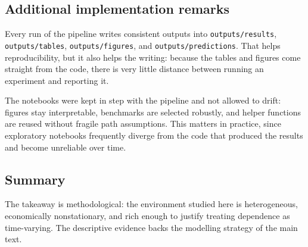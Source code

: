 \subsection{Additional implementation remarks}

Every run of the pipeline writes consistent outputs into \texttt{outputs/results}, \texttt{outputs/tables}, \texttt{outputs/figures}, and \texttt{outputs/predictions}. That helps reproducibility, but it also helps the writing: because the tables and figures come straight from the code, there is very little distance between running an experiment and reporting it.

The notebooks were kept in step with the pipeline and not allowed to drift: figures stay interpretable, benchmarks are selected robustly, and helper functions are reused without fragile path assumptions. This matters in practice, since exploratory notebooks frequently diverge from the code that produced the results and become unreliable over time.

\subsection{Summary}

The takeaway is methodological: the environment studied here is heterogeneous, economically nonstationary, and rich enough to justify treating dependence as time-varying. The descriptive evidence backs the modelling strategy of the main text.
